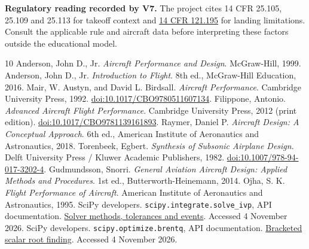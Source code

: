 \documentclass[11pt,letterpaper]{article}
\begin{document}
\textbf{Regulatory reading recorded by V7.}
The project cites 14 CFR 25.105, 25.109 and 25.113 for takeoff context and
\href{https://www.ecfr.gov/current/title-14/chapter-I/subchapter-G/part-121/subpart-I/section-121.195}{14 CFR 121.195}
for landing limitations. Consult the applicable rule and aircraft data before
interpreting these factors outside the educational model.

\clearpage
{}
{}
\renewcommand{\refname}{References}
\begin{thebibliography}{10}
\setlength{\itemsep}{9pt}
Anderson, John D., Jr. \emph{Aircraft Performance and Design}.
McGraw-Hill, 1999.
Anderson, John D., Jr. \emph{Introduction to Flight}. 8th ed.,
McGraw-Hill Education, 2016.
Mair, W. Austyn, and David L. Birdsall. \emph{Aircraft Performance}.
Cambridge University Press, 1992.
\href{https://doi.org/10.1017/CBO9780511607134}{doi:10.1017/CBO9780511607134}.
Filippone, Antonio. \emph{Advanced Aircraft Flight Performance}.
Cambridge University Press, 2012 (print edition).
\href{https://doi.org/10.1017/CBO9781139161893}{doi:10.1017/CBO9781139161893}.
Raymer, Daniel P. \emph{Aircraft Design: A Conceptual Approach}.
6th ed., American Institute of Aeronautics and Astronautics, 2018.
Torenbeek, Egbert. \emph{Synthesis of Subsonic Airplane Design}.
Delft University Press / Kluwer Academic Publishers, 1982.
\href{https://doi.org/10.1007/978-94-017-3202-4}{doi:10.1007/978-94-017-3202-4}.
Gudmundsson, Snorri. \emph{General Aviation Aircraft Design:
Applied Methods and Procedures}. 1st ed., Butterworth-Heinemann, 2014.
Ojha, S. K. \emph{Flight Performance of Aircraft}.
American Institute of Aeronautics and Astronautics, 1995.
SciPy developers. \texttt{scipy.integrate.solve\_ivp}, API documentation.
\href{https://docs.scipy.org/doc/scipy/reference/generated/scipy.integrate.solve_ivp.html}{Solver methods, tolerances and events}. Accessed 4 November 2026.
SciPy developers. \texttt{scipy.optimize.brentq}, API documentation.
\href{https://docs.scipy.org/doc/scipy/reference/generated/scipy.optimize.brentq.html}{Bracketed scalar root finding}. Accessed 4 November 2026.
\end{thebibliography}
\end{document}
